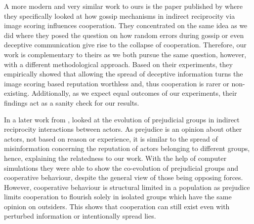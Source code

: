 \documentclass[sigconf]{acmart}
\begin{document}
    A more modern and very similar work to ours is the paper published by \citeauthor{szamado_deception_2016} \cite{szamado_deception_2016} where they specifically looked at how gossip mechanisms in indirect reciprocity via image scoring influences cooperation.
    They concentrated on the same idea as we did where they posed the question on how random errors during gossip or even deceptive communication give rise to the collapse of cooperation.
    Therefore, our work is complementary to theirs as we both pursue the same question, however, with a different methodological approach.
    Based on their experiments, they empirically showed that allowing the spread of deceptive information turns the image scoring based reputation worthless and, thus cooperation is rarer or non-existing.
    Additionally, as we expect equal outcomes of our experiments, their findings act as a sanity check for our results.

    In a later work from \citeyear{whitaker_indirect_2018}, \citeauthor{whitaker_indirect_2018} \cite{whitaker_indirect_2018} looked at the evolution of prejudicial groups in indirect reciprocity interactions between actors.
    As prejudice is an opinion about other actors, not based on reason or experience, it is similar to the spread of misinformation concerning the reputation of actors belonging to different groups, hence, explaining the relatedness to our work.
    With the help of computer simulations they were able to show the co-evolution of prejudicial groups and cooperative behaviour, despite the general view of those being opposing forces.
    However, cooperative behaviour is structural limited in a population as prejudice limits cooperation to flourish solely in isolated groups which have the same opinion on outsiders.
    This shows that cooperation can still exist even with perturbed information or intentionally spread lies.
\end{document}
